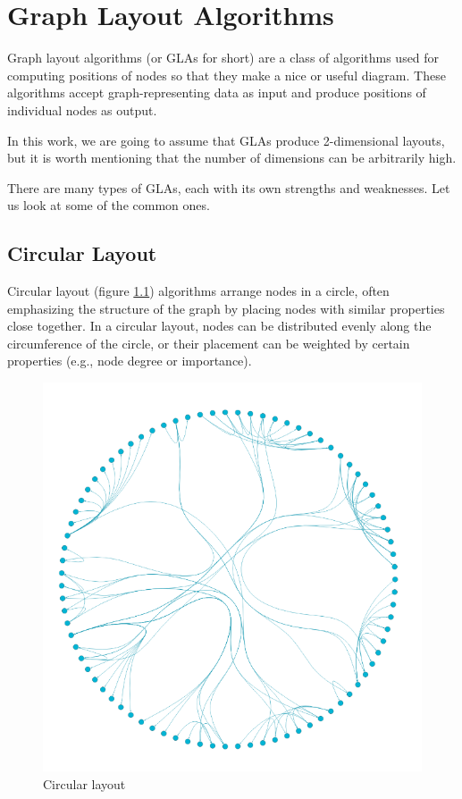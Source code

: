 \chapter{Graph Layout Algorithms}

Graph layout algorithms (or GLAs for short) are a class of algorithms used for computing positions
of nodes so that they make a nice or useful diagram.
These algorithms accept graph-representing data as input and produce positions of individual nodes as output.

In this work, we are going to assume that GLAs produce 2-dimensional layouts,
but it is worth mentioning that the number of dimensions can be arbitrarily high.

There are many types of GLAs, each with its own strengths and weaknesses.
Let us look at some of the common ones.

\section{Circular Layout}

Circular layout (figure \ref{obr:graph_layout_circular}) algorithms arrange nodes in a circle, often emphasizing the structure of the graph by placing nodes
with similar properties close together.
In a circular layout, nodes can be distributed evenly along the circumference of the circle,
or their placement can be weighted by certain properties (e.g., node degree or importance).

\begin{figure}[p]\centering
    \includegraphics[width=140mm, keepaspectratio]{img/graph_layout_cicrular.png}
    \caption{Circular layout\cite{graph_layout_demos}}
    \label{obr:graph_layout_circular}
\end{figure}

